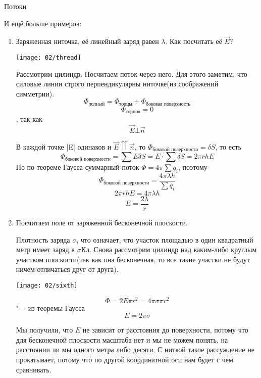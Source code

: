\begin{section}{Потоки}
\begin{enumerate}
\end{enumerate}

И ещё больше примеров:
\begin{enumerate}

\item
	Заряженная ниточка, её линейный заряд равен $\lambda$. Как посчитать её $\vec{E}$?
	\begin{center}
	\texttt{[image: 02/thread]}
	\end{center}

	Рассмотрим цилиндр. Посчитаем поток через него. Для этого заметим, что силовые линии строго перпендикулярны ниточке(из соображений
	симметрии).
	\[\Phi_{\text{полный}} = \Phi_{\text{торцы}} + \Phi_{\text{боковая поверхность}}\]
	\[\Phi_{\text{торцов}} = 0\], так как \[\vec{E} \bot \vec{n}\]
	
	В каждой точке |E| одинаков и $\vec{E} \upuparrows \vec{n}$, то $\Phi_{\text{боковой поверхности}} = \delta S$, то есть
	\[\Phi_{\text{боковой поверхности}} = \sum E \delta S = E \cdot \sum \delta S = 2 \pi r h E\]
	Но по теореме Гаусса суммарный поток $\Phi = 4\pi\sum q_i$, поэтому
	\[\Phi_{\text{боковой поверхности}} = \frac{4\pi\lambda h}{\sum q_i}\]
	\[2\pi r h E = 4 \pi \lambda h\]
	\[E = \frac{2 \lambda}{r}\]
	
\item
	Посчитаем поле от заряженной бесконечной плоскости.
	
	Плотность заряда $\sigma$, что означает, что участок площадью в один квадратный метр имеет заряд в $\sigma \text{Кл}$.
	Снова рассмотрим цилиндр над каким-либо круглым участком плоскости(так как она бесконечная, то все такие участки не будут
	ничем отличаться друг от друга).
	\begin{center}
	\texttt{[image: 02/sixth]}
	\end{center}

	\[\Phi = 2E\pi r^2 = 4\pi\sigma\pi r^2\] "--- из теоремы Гаусса
	\[E = 2\pi\sigma\]
	
	Мы получили, что $E$ не зависит от расстояния до поверхности, потому что для бесконечной плоскости масштаба нет 
	и мы не можем понять, на расстоянии ли мы одного метра либо десяти. С ниткой такое рассуждение не прокатывает, потому что по другой 
	координатной оси нам будет с чем сравнивать.

\end{enumerate}

\end{section}

